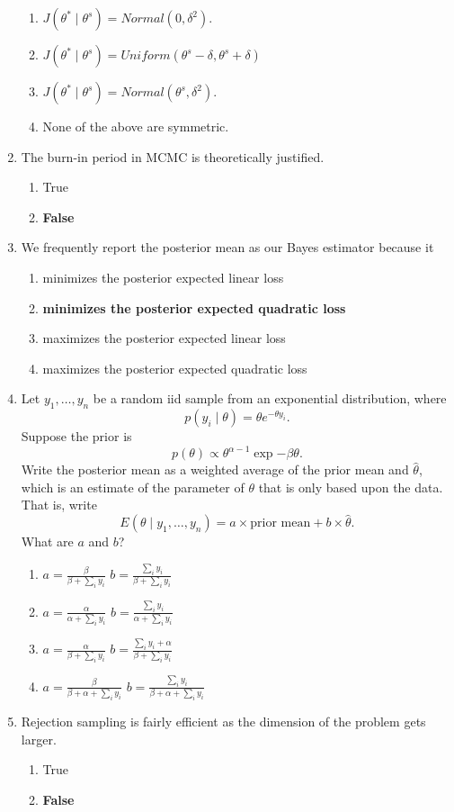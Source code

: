 \documentclass[12pt]{article}
\begin{document}
\begin{enumerate}
\begin{enumerate}
\item $J(\theta^*\mid \theta^{s}) = Normal(0, \delta^2).$
\item $J(\theta^*\mid \theta^{s}) = Uniform(\theta^{s} - \delta, \theta^{s} + \delta)$
\item $J(\theta^*\mid \theta^{s})  = Normal(\theta^{s}, \delta^2).$
\item None of the above are symmetric.
\end{enumerate}
\item The burn-in period in MCMC is theoretically justified.
\begin{enumerate}
\item True
\item \textbf{False}
\end{enumerate}
\item We frequently report the posterior mean as our Bayes estimator because it
\begin{enumerate}
\item minimizes the posterior expected linear loss
\item \textbf{minimizes the posterior expected quadratic loss}
\item maximizes the posterior expected linear loss
\item maximizes the posterior expected quadratic loss
\end{enumerate}
\item Let $y_1,\ldots, y_n$ be a random iid sample from an exponential distribution, where $$p(y_i \mid \theta) = \theta e^{-\theta y_i}.$$ Suppose the prior is 
$$p(\theta) \propto \theta^{\alpha-1} \exp{-\beta \theta}. $$
Write the posterior mean as a weighted average of the prior mean and $\hat{\theta}$, which is an estimate of the parameter of $\theta$ that is only based upon the data. That is, write 
$$E(\theta \mid y_1,\ldots, y_n) = a \times \text{prior mean} + b \times \hat{\theta}.$$
What are $a$ and $b$?
\begin{enumerate}
\item $a=\frac{\beta}{\beta + \sum_i y_i}$  \quad $b=\frac{ \sum_i y_i}{\beta + \sum_i y_i}$ 
\item $a=\frac{\alpha}{\alpha+ \sum_i y_i}$  \quad $b=\frac{ \sum_i y_i}{\alpha + \sum_i y_i}$ 
\item  $a=\frac{\alpha}{\beta+ \sum_i y_i}$  \quad $b=\frac{ \sum_i y_i + \alpha}{\beta + \sum_i y_i}$ 
\item $a=\frac{\beta}{\beta + \alpha +  \sum_i y_i}$  \quad $b=\frac{ \sum_i y_i}{\beta + \alpha + \sum_i y_i}$ 
\end{enumerate}
\item Rejection sampling is fairly efficient as the dimension of the problem gets larger.
\begin{enumerate}
\item True
\item \textbf{False}
\end{enumerate}
\end{enumerate}
\end{document}
